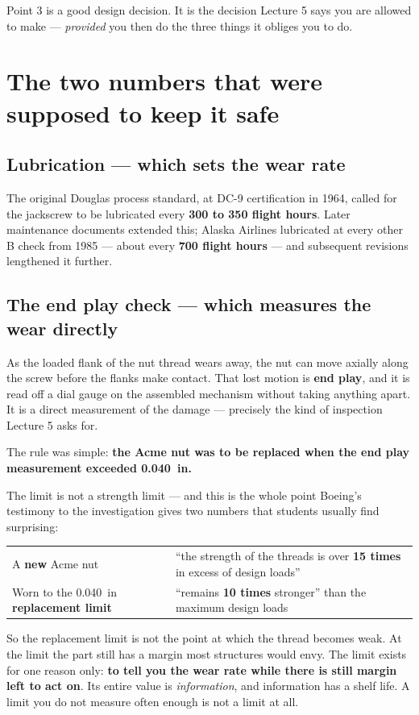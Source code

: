 \documentclass[11pt,a4paper]{article}
\begin{document}
\medskip
Point 3 is a good design decision. It is the decision Lecture 5 says you are allowed to make ---
\emph{provided} you then do the three things it obliges you to do.

\section{The two numbers that were supposed to keep it safe}

\subsection*{Lubrication --- which sets the wear rate}

The original Douglas process standard, at DC-9 certification in 1964, called for the jackscrew to be
lubricated every \textbf{300 to 350 flight hours}. Later maintenance documents extended this; Alaska
Airlines lubricated at every other B check from 1985 --- about every \textbf{700 flight hours} ---
and subsequent revisions lengthened it further.

\subsection*{The end play check --- which measures the wear directly}

As the loaded flank of the nut thread wears away, the nut can move axially along the screw before
the flanks make contact. That lost motion is \textbf{end play}, and it is read off a dial gauge on
the assembled mechanism without taking anything apart. It is a direct measurement of the damage ---
precisely the kind of inspection Lecture 5 asks for.

\medskip
The rule was simple: \textbf{the Acme nut was to be replaced when the end play measurement exceeded
\SI{0.040}{in}.}

\begin{keybox}{The limit is not a strength limit --- and this is the whole point}
Boeing's testimony to the investigation gives two numbers that students usually find surprising:

\begin{center}\small
\begin{tabular}{@{}p{5.0cm}p{9.4cm}@{}}
\toprule
A \textbf{new} Acme nut & ``the strength of the threads is over \textbf{15 times} in excess of
  design loads''\\[2pt]
Worn to the \SI{0.040}{in} \textbf{replacement limit} & ``remains \textbf{10 times} stronger'' than
  the maximum design loads\\
\bottomrule
\end{tabular}
\end{center}

\medskip
So the replacement limit is not the point at which the thread becomes weak. At the limit the part
still has a margin most structures would envy. The limit exists for one reason only: \textbf{to tell
you the wear rate while there is still margin left to act on}. Its entire value is \emph{information},
and information has a shelf life. A limit you do not measure often enough is not a limit at all.
\end{keybox}
\end{document}
